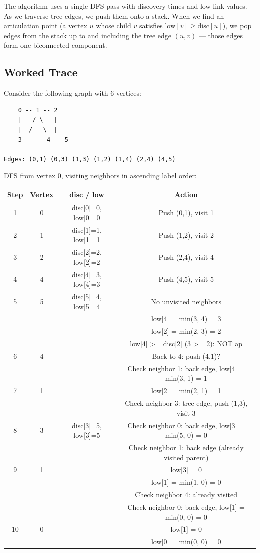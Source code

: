 The algorithm uses a single DFS pass with discovery times and low-link values. As we traverse tree edges, we push them onto a stack. When we find an articulation point (a vertex $u$ whose child $v$ satisfies $\text{low}[v] \ge \text{disc}[u]$), we pop edges from the stack up to and including the tree edge $(u, v)$ — those edges form one biconnected component.

\subsection{Worked Trace}

Consider the following graph with 6 vertices:

\begin{lstlisting}
    0 -- 1 -- 2
    |   / \   |
    |  /   \  |
    3       4 -- 5

Edges: (0,1) (0,3) (1,3) (1,2) (1,4) (2,4) (4,5)
\end{lstlisting}

DFS from vertex 0, visiting neighbors in ascending label order:

\begin{center}
\begin{tabular}{cccc}
\toprule
Step & Vertex & disc / low & Action \\
\midrule
1 & 0 & disc[0]=0, low[0]=0 & Push (0,1), visit 1 \\
2 & 1 & disc[1]=1, low[1]=1 & Push (1,2), visit 2 \\
3 & 2 & disc[2]=2, low[2]=2 & Push (2,4), visit 4 \\
4 & 4 & disc[4]=3, low[4]=3 & Push (4,5), visit 5 \\
5 & 5 & disc[5]=4, low[5]=4 & No unvisited neighbors \\
& & & low[4] = min(3, 4) = 3 \\
& & & low[2] = min(2, 3) = 2 \\
& & & low[4] >= disc[2] (3 >= 2): NOT ap \\
6 & 4 & & Back to 4: push (4,1)? \\
& & & Check neighbor 1: back edge, low[4] = min(3, 1) = 1 \\
7 & 1 & & low[2] = min(2, 1) = 1 \\
& & & Check neighbor 3: tree edge, push (1,3), visit 3 \\
8 & 3 & disc[3]=5, low[3]=5 & Check neighbor 0: back edge, low[3] = min(5, 0) = 0 \\
& & & Check neighbor 1: back edge (already visited parent) \\
9 & 1 & & low[3] = 0 \\
& & & low[1] = min(1, 0) = 0 \\
& & & Check neighbor 4: already visited \\
& & & Check neighbor 0: back edge, low[1] = min(0, 0) = 0 \\
10 & 0 & & low[1] = 0 \\
& & & low[0] = min(0, 0) = 0 \\
\bottomrule
\end{tabular}
\end{center}

